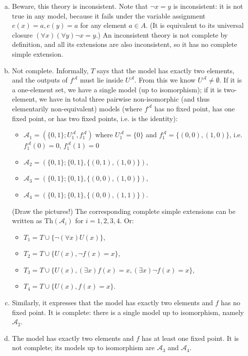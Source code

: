 \begin{problem}
    \begin{solution}
        \begin{enumerate}[(a)]
            \item Beware, this theory is inconsistent. Note that $\neg x=y$ is inconsistent: it is not true in any model, because it fails under the variable assignment $e(x)=a,e(y)=a$ for any element $a\in A$. (It is equivalent to its universal closure $(\forall x)(\forall y)\neg x=y$.) An inconsistent theory is not complete by definition, and all its extensions are also inconsistent, so it has no complete simple extension.
            \item Not complete. Informally, $T$ says that the model has exactly two elements, and the outputs of $f^\mathcal A$ must lie inside $U^\mathcal A$. From this we know $U^\mathcal A\neq\emptyset$. If it is a one-element set, we have a single model (up to isomorphism); if it is two-element, we have in total three pairwise non-isomorphic (and thus elementarily non-equivalent) models (where $f^\mathcal A$ has no fixed point, has one fixed point, or has two fixed points, i.e. is the identity):
            \begin{itemize}
                \item $\mathcal A_1=(\{0,1\};U^\mathcal A_1,f^\mathcal A_1)$ where $U^\mathcal A_1=\{0\}$ and $f^\mathcal A_1=\{(0,0),(1,0)\}$, i.e. $f^\mathcal A_1(0)=0$, $f^\mathcal A_1(1)=0$
                \item $\mathcal A_2=(\{0,1\};\{0,1\},\{(0,1),(1,0)\})$,
                \item $\mathcal A_3=(\{0,1\};\{0,1\},\{(0,0),(1,0)\})$,
                \item $\mathcal A_4=(\{0,1\};\{0,1\},\{(0,0),(1,1)\})$.
            \end{itemize} 
            (Draw the pictures!) The corresponding complete simple extensions can be written as $\mathrm{Th}(\mathcal A_i)$ for $i=1,2,3,4$. Or:
            \begin{itemize}
                \item $T_1=T\cup\{\neg (\forall x) U(x)\}$,
                \item $T_2=T\cup\{U(x),\neg f(x)=x\}$,
                \item $T_3=T\cup\{U(x),(\exists x)f(x)=x,(\exists x)\neg f(x)=x\}$,
                \item $T_4=T\cup\{U(x),f(x)=x\}$.
            \end{itemize}
            \item Similarly, it expresses that the model has exactly two elements and $f$ has no fixed point. It is complete: there is a single model up to isomorphism, namely $\mathcal A_2$.
            \item The model has exactly two elements and $f$ has at least one fixed point. It is not complete; its models up to isomorphism are $\mathcal A_3$ and $\mathcal A_4$.
            

        \end{enumerate}
                    
    \end{solution}

\end{problem}

